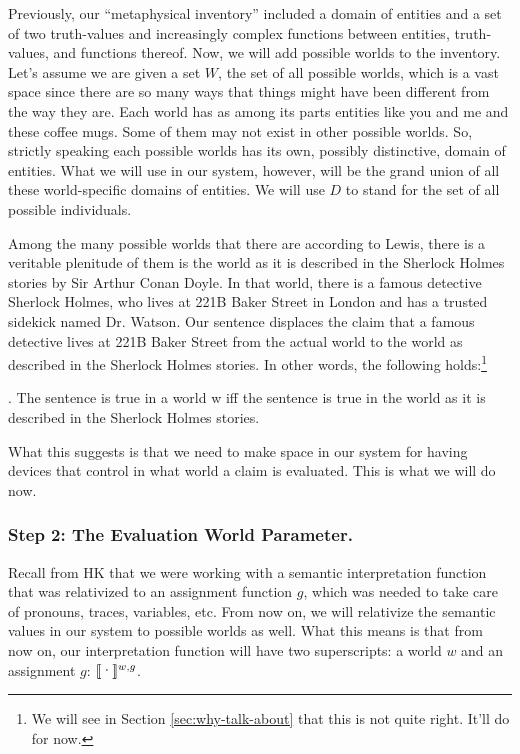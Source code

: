 %
Previously, our ``metaphysical inventory'' included a domain of entities and a
set of two truth-values and increasingly complex functions between entities,
truth-values, and functions thereof. Now, we will add possible worlds to the
inventory. Let's assume we are given a set $W$, the set of all possible worlds,
which is a vast space since there are so many ways that things might have been
different from the way they are. Each world has as among its parts entities like
you and me and these coffee mugs. Some of them may not exist in other possible
worlds. So, strictly speaking each possible worlds has its own, possibly
distinctive, domain of entities. What we will use in our system, however, will
be the grand union of all these world-specific domains of entities. We will use
$D$ to stand for the set of all possible individuals.

Among the many possible worlds that there are \dash according to Lewis, there is
a veritable plenitude of them \dash is the world as it is described in the
Sherlock Holmes stories by Sir Arthur Conan Doyle. In that world, there is a
famous detective Sherlock Holmes, who lives at 221B Baker Street in London and
has a trusted sidekick named Dr. Watson. Our sentence  displaces the
claim that a famous detective lives at 221B Baker Street from the actual world
to the world as described in the Sherlock Holmes stories. In other words, the
following holds:\footnote{We will see in Section \ref{sec:why-talk-about} that
  this is not quite right. It'll do for now.}

\ex. The sentence  is true in a world w iff the sentence  is true in the world as it is described
in the Sherlock Holmes stories.

What this suggests is that we need to make space in our system for having
devices that control in what world a claim is evaluated. This is what we will do
now.

\subsubsection{Step 2: The Evaluation World Parameter.} \label{sec:eval-world-param}

Recall from H\amp K that we were working with a semantic interpretation function
that was relativized to an assignment function $g$, which was needed to take
care of pronouns, traces, variables, etc. From now on, we will relativize the
semantic values in our system to possible worlds as well. What this means is
that from now on, our interpretation function will have two superscripts: a
world $w$ and an assignment $g$: $\sv{\mbox{\textperiodcentered}}^{w,g}$.

